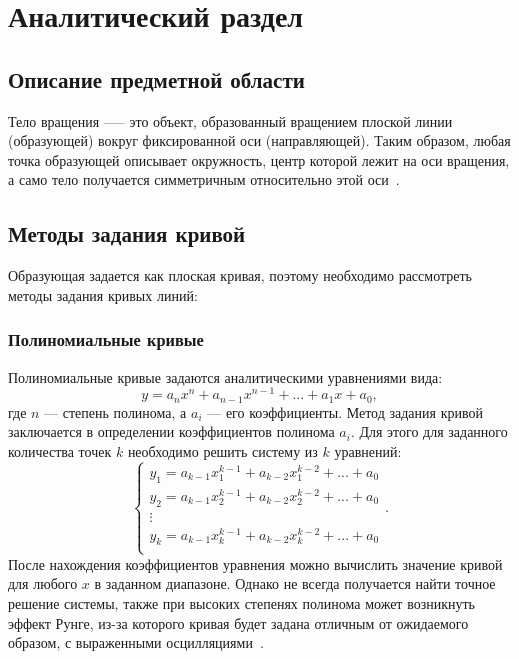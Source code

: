 \chapter{Аналитический раздел}

\section{Описание предметной области}
Тело вращения —-- это объект, образованный вращением плоской линии (образующей) вокруг фиксированной оси (направляющей). Таким образом, любая точка образующей описывает окружность, центр которой лежит на оси вращения, а само тело получается симметричным относительно этой оси~\cite{Тела_вращения}.

\section{Методы задания кривой}
Образующая задается как плоская кривая, поэтому необходимо рассмотреть методы задания кривых линий:
\subsection{Полиномиальные кривые}
Полиномиальные кривые задаются аналитическими уравнениями вида:
\begin{equation}
    y = a_nx^n + a_{n-1}x^{n-1} + ... + a_1x + a_0,
\end{equation}
где $n$ --- степень полинома, а $a_i$ --- его коэффициенты. Метод задания кривой заключается в определении коэффициентов полинома $a_i$. Для этого для заданного количества точек $k$ необходимо решить систему из $k$ уравнений:
\begin{equation}
    \begin{cases}
    y_1 = a_{k-1}x_1^{k-1} + a_{k-2}x_1^{k-2} + ... + a_0 \\
    y_2 = a_{k-1}x_2^{k-1} + a_{k-2}x_2^{k-2} + ... + a_0 \\
    \vdots	\\
    y_k = a_{k-1}x_k^{k-1} + a_{k-2}x_k^{k-2} + ... + a_0 \\
    \end{cases}.
\end{equation}
После нахождения коэффициентов уравнения можно вычислить значение кривой для любого $x$ в заданном диапазоне. Однако не всегда получается найти точное решение системы, также при высоких степенях полинома может возникнуть эффект Рунге, из-за которого кривая будет задана отличным от ожидаемого образом, с выраженными осцилляциями~\cite{Рунге}.

